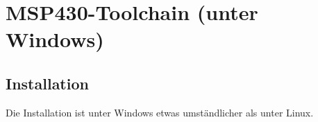 \section{MSP430-Toolchain (unter Windows)}
\subsection{Installation}
Die Installation ist unter Windows etwas umständlicher als unter Linux. 








